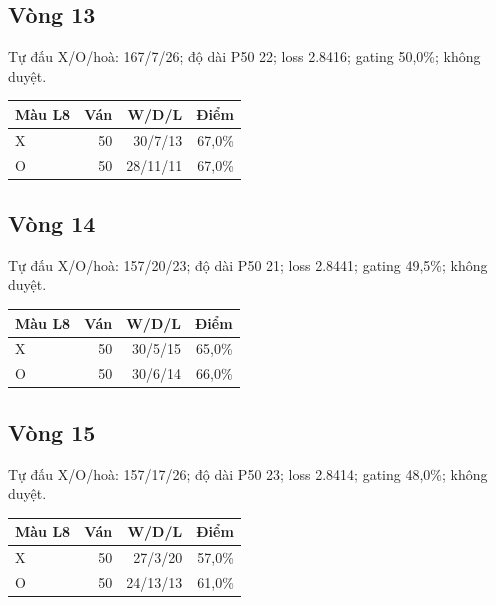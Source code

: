 \subsection*{Vòng 13}

Tự đấu X/O/hoà: 167/7/26; độ dài P50 22; loss 2.8416; gating 50,0\%; không duyệt.

\begin{center}\scriptsize\begin{tabular}{@{}lrrr@{}}\toprule

Màu L8 & Ván & W/D/L & Điểm \\

\midrule

X & 50 & 30/7/13 & 67,0\% \\

O & 50 & 28/11/11 & 67,0\% \\

\bottomrule\end{tabular}\end{center}

\subsection*{Vòng 14}

Tự đấu X/O/hoà: 157/20/23; độ dài P50 21; loss 2.8441; gating 49,5\%; không duyệt.

\begin{center}\scriptsize\begin{tabular}{@{}lrrr@{}}\toprule

Màu L8 & Ván & W/D/L & Điểm \\

\midrule

X & 50 & 30/5/15 & 65,0\% \\

O & 50 & 30/6/14 & 66,0\% \\

\bottomrule\end{tabular}\end{center}

\subsection*{Vòng 15}

Tự đấu X/O/hoà: 157/17/26; độ dài P50 23; loss 2.8414; gating 48,0\%; không duyệt.

\begin{center}\scriptsize\begin{tabular}{@{}lrrr@{}}\toprule

Màu L8 & Ván & W/D/L & Điểm \\

\midrule

X & 50 & 27/3/20 & 57,0\% \\

O & 50 & 24/13/13 & 61,0\% \\

\bottomrule\end{tabular}\end{center}

